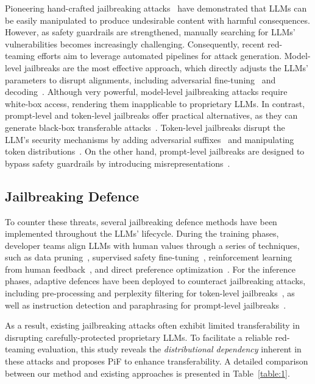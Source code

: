 Pioneering hand-crafted jailbreaking attacks~\citep{shen2023anything, liu2023jailbreaking} have demonstrated that LLMs can be easily manipulated to produce undesirable content with harmful consequences. 
However, as safety guardrails are strengthened, manually searching for LLMs' vulnerabilities becomes increasingly challenging.
Consequently, recent red-teaming efforts aim to leverage automated pipelines for attack generation.
Model-level jailbreaks are the most effective approach, which directly adjusts the LLMs' parameters to disrupt alignments, including adversarial fine-tuning~\citep{yang2023shadow, qi2024fine} and decoding~\citep{huang2023catastrophic, zhang2023safety}.
Although very powerful, model-level jailbreaking attacks require white-box access, rendering them inapplicable to proprietary LLMs.
In contrast, prompt-level and token-level jailbreaks offer practical alternatives, as they can generate black-box transferable attacks~\citep{zou2023universal, chao2023jailbreaking}.
Token-level jailbreaks disrupt the LLM's security mechanisms by adding adversarial suffixes~\citep{lapid2023open, liuautodan, sitawarin2024pal} and manipulating token distributions~\citep{yong2023low, deng2024multilingual,zhao2024weak}.
On the other hand, prompt-level jailbreaks are designed to bypass safety guardrails by introducing misrepresentations~\citep{mehrotra2023tree, li2023deepinception}.

\subsection{Jailbreaking Defence}
\label{section:2_3}

To counter these threats, several jailbreaking defence methods have been implemented throughout the LLMs' lifecycle.
During the training phases, developer teams align LLMs with human values through a series of techniques, such as data pruning~\citep{lukas2023analyzing, openAI2023our, llama3modelcard}, supervised safety fine-tuning~\citep{touvron2023llama, chung2024scaling}, reinforcement learning from human feedback~\citep{schulman2017proximal, christiano2017deep, bai2022training}, and direct preference optimization~\citep{rafailov2024direct, zengtoken}.
For the inference phases, adaptive defences have been deployed to counteract jailbreaking attacks, including pre-processing and perplexity filtering for token-level jailbreaks~\citep{kumar2023certifying, robey2023smoothllm,alon2023detecting, jain2023baseline}, as well as instruction detection and paraphrasing for prompt-level jailbreaks~\citep{inan2023llama, markov2023holistic,zhang2023defending, zheng2024prompt, xie2023defending}.

As a result, existing jailbreaking attacks often exhibit limited transferability in disrupting carefully-protected proprietary LLMs.
To facilitate a reliable red-teaming evaluation, this study reveals the \emph{distributional dependency} inherent in these attacks and proposes PiF to enhance transferability.
A detailed comparison between our method and existing approaches is presented in Table~\ref{table:1}.